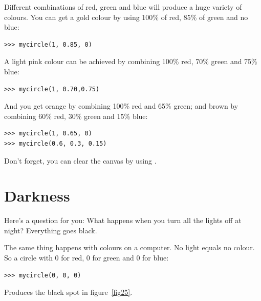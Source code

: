 \noindent
Different combinations of red, green and blue will produce a huge variety of colours.  You can get a gold colour by using 100\% of red, 85\% of green and no blue:

\begin{listing}
\begin{verbatim}
>>> mycircle(1, 0.85, 0)
\end{verbatim}
\end{listing}

\noindent
A light pink colour can be achieved by combining 100\% red, 70\% green and 75\% blue:

\begin{listing}
\begin{verbatim}
>>> mycircle(1, 0.70,0.75)
\end{verbatim}
\end{listing}

\noindent
And you get orange by combining 100\% red and 65\% green; and brown by combining 60\% red, 30\% green and 15\% blue:

\begin{listing}
\begin{verbatim}
>>> mycircle(1, 0.65, 0)
>>> mycircle(0.6, 0.3, 0.15)
\end{verbatim}
\end{listing}

\noindent
Don't forget, you can clear the canvas by using .

\section{Darkness}

Here's a question for you:  What happens when you turn all the lights off at night? Everything goes black.
\par
The same thing happens with colours on a computer.  No light equals no colour.  So a circle with 0 for red, 0 for green and 0 for blue:

\begin{listing}
\begin{verbatim}
>>> mycircle(0, 0, 0)
\end{verbatim}
\end{listing}

Produces the black spot in figure~\ref{fig25}.


